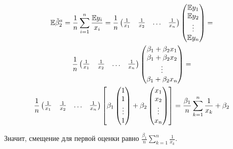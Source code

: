 \begin{problem}
\begin{sol}
\begin{multline*}
\mathbb{E}\tilde{\beta}_2^a = \frac{1}{n}\sum_{i=1}^n \frac{\mathbb{E} y_i}{x_i} = \frac{1}{n} \begin{pmatrix}
\frac{1}{x_1} & \frac{1}{x_2} & \ldots & \frac{1}{x_n}
\end{pmatrix} \begin{pmatrix}
\mathbb{E} y_1\\
\mathbb{E} y_2\\
\vdots\\
\mathbb{E} y_n\\
\end{pmatrix} = \\
 \frac{1}{n} \begin{pmatrix}
\frac{1}{x_1} & \frac{1}{x_2} & \ldots & \frac{1}{x_n}
\end{pmatrix} \begin{pmatrix}
\beta_1 + \beta_2 x_1\\
\beta_1 + \beta_2 x_2\\
\vdots\\
\beta_1 + \beta_2 x_n\\
\end{pmatrix} = \\
\frac{1}{n} \begin{pmatrix}
\frac{1}{x_1} & \frac{1}{x_2} & \ldots & \frac{1}{x_n}
\end{pmatrix} \left[ \beta_1 \begin{pmatrix}
1\\
1\\
\vdots\\
1\\
\end{pmatrix} + \beta_2 \begin{pmatrix}
x_1\\
x_2\\
\vdots\\
x_n\\
\end{pmatrix} \right] = \frac{\beta_1}{n}\sum_{k=1}^n \frac{1}{x_k} + \beta_2
\end{multline*}

Значит, смещение для первой оценки равно $\frac{\beta_1}{n}\sum_{k=1}^n \frac{1}{x_k}$.


\end{sol}
\end{problem}

